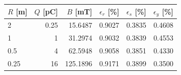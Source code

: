 \begin{tabular}{lrrrrr}
\toprule
$R$ [m] & $Q$ [pC] & $B$ [mT] & $\epsilon_r$ [\%] & $\epsilon_s$ [\%] & $\epsilon_y$ [\%] \\
\midrule
2 & 0.25 & 15.6487 & 0.9027 & 0.3835 & 0.4608 \\
1 & 1 & 31.2974 & 0.9032 & 0.3839 & 0.4553 \\
0.5 & 4 & 62.5948 & 0.9058 & 0.3851 & 0.4330 \\
0.25 & 16 & 125.1896 & 0.9171 & 0.3899 & 0.3500 \\
\bottomrule
\end{tabular}
